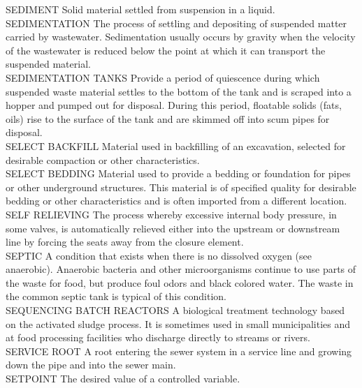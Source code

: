 SEDIMENT
Solid material settled from suspension in a liquid. 
\vspace{0.3cm}\\
SEDIMENTATION
The process of settling and depositing of suspended matter carried by wastewater. Sedimentation usually occurs by gravity when the velocity of the wastewater is reduced below the point at which it can transport the suspended material. 
\vspace{0.3cm}\\
SEDIMENTATION TANKS
Provide a period of quiescence during which suspended waste material settles to the bottom of the tank and is scraped into a hopper and pumped out for disposal. During this period, floatable solids (fats, oils) rise to the surface of the tank and are skimmed off into scum pipes for disposal.
\vspace{0.3cm}\\
SELECT BACKFILL
Material used in backfilling of an excavation, selected for desirable compaction or other characteristics. 
\vspace{0.3cm}\\
SELECT BEDDING
Material used to provide a bedding or foundation for pipes or other underground structures. This material is of specified quality for desirable bedding or other characteristics and is often imported from a different location. 
\vspace{0.3cm}\\
SELF RELIEVING
The process whereby excessive internal body pressure, in some valves, is automatically relieved either into the upstream or downstream line by forcing the seats away from the closure element.
\vspace{0.3cm}\\
SEPTIC
A condition that exists when there is no dissolved oxygen (see anaerobic). Anaerobic bacteria and other microorganisms continue to use parts of the waste for food, but produce foul odors and black colored water. The waste in the common septic tank is typical of this condition.
\vspace{0.3cm}\\
SEQUENCING BATCH REACTORS
A biological treatment technology based on the activated sludge process. It is sometimes used in small municipalities and at food processing facilities who discharge directly to streams or rivers.
\vspace{0.3cm}\\
SERVICE ROOT
A root entering the sewer system in a service line and growing down the pipe and into the sewer main. 
\vspace{0.3cm}\\
SETPOINT
The desired value of a controlled variable.
\vspace{0.3cm}\\

